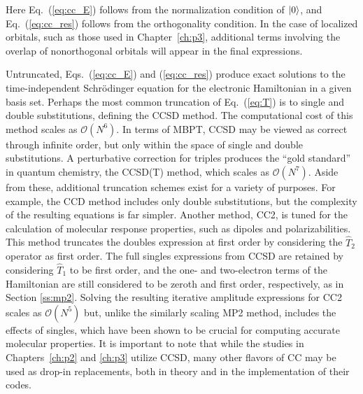 Here Eq.~(\ref{eq:cc_E}) follows from the normalization condition of $| 0 \rangle$, 
and Eq.~(\ref{eq:cc_res}) follows from the orthogonality condition. 
In the case of localized orbitals, such as those used in Chapter~\ref{ch:p3}, additional terms 
involving the overlap of nonorthogonal orbitals will appear in the final expressions. 

Untruncated, Eqs.~(\ref{eq:cc_E}) and (\ref{eq:cc_res}) produce exact
solutions to the time-independent Schr\"odinger equation for the
electronic Hamiltonian in a given basis set. Perhaps the most common
truncation of Eq.~(\ref{eq:T}) is to single and double substitutions,
defining the CCSD method. The computational cost of this method scales as
$\mathcal{O}(N^6)$. In terms of MBPT, CCSD may be viewed as correct through
infinite order, but only within the space of single and double substitutions.
A perturbative correction for triples produces the ``gold standard'' in
quantum chemistry, the CCSD(T) method, \cite{Raghavachari1989,Bartlett2005}
which scales as $\mathcal{O}(N^7)$. Aside from these, additional truncation
schemes exist for a variety of purposes. For example, the CCD method
includes only double substitutions, but the complexity of the resulting
equations is far simpler. Another method, CC2,\cite{Christiansen1995}
is tuned for the calculation of molecular response properties, such as
dipoles and polarizabilities. This method truncates the doubles expression
at first order by considering the $\hat{T}_2$ operator as first order. The
full singles expressions from CCSD are retained by considering $\hat{T}_1$
to be first order, and the one- and two-electron terms of the Hamiltonian are
still considered to be zeroth and first order, respectively, as in Section
\ref{ss:mp2}. Solving the resulting iterative amplitude expressions for CC2
scales as $\mathcal{O}(N^5)$ but, unlike the similarly scaling MP2 method,
includes the effects of singles, which have been shown to be crucial for
computing accurate molecular properties.
\cite{Christiansen1995,Koch1997}
It is important to note that while the studies in Chapters~\ref{ch:p2} and \ref{ch:p3}
utilize CCSD, many other flavors of CC may be used as drop-in replacements,
both in theory and in the implementation of their codes.

